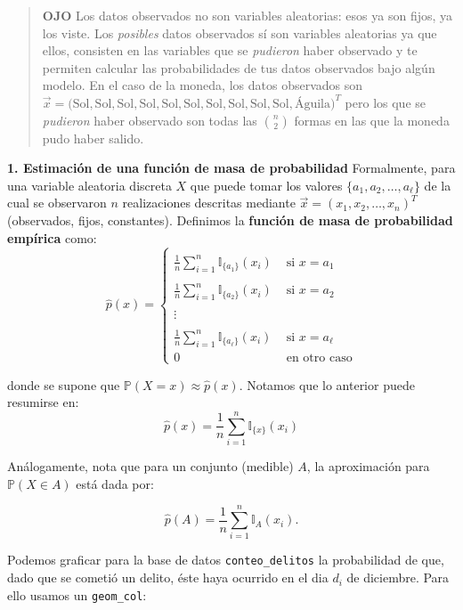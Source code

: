 \documentclass[
]{book}
\begin{document}
\begin{quote}
\textbf{OJO} Los datos observados no son variables aleatorias: esos ya son fijos, ya los viste. Los \emph{posibles} datos observados sí son variables aleatorias ya que ellos, consisten en las variables que se \emph{pudieron} haber observado y te permiten calcular las probabilidades de tus datos observados bajo algún modelo. En el caso de la moneda, los datos observados son \(\vec{x} = \big( \text{Sol}, \text{Sol},\text{Sol},\text{Sol},\text{Sol},\text{Sol},\text{Sol},\text{Sol},\text{Sol},\text{Sol},\text{Águila}\big)^T\) pero los que se \emph{pudieron} haber observado son todas las \(\binom{n}{2}\) formas en las que la moneda pudo haber salido.
\end{quote}

\textbf{1. Estimación de una función de masa de probabilidad}
Formalmente, para una variable aleatoria discreta \(X\) que puede tomar los valores \(\{ a_1, a_2, \dots, a_{\ell} \}\) de la cual se observaron \(n\) realizaciones descritas mediante \(\vec{x} = (x_1, x_2, \dots, x_n)^T\) (observados, fijos, constantes). Definimos la \textbf{función de masa de probabilidad empírica} como:
\[
\hat{p}(x) = \begin{cases}
\\
\frac{1}{n} \sum_{i=1}^{n} \mathbb{I}_{\{a_1\}}(x_i) & \text{ si } x = a_1 \\ \\
\frac{1}{n} \sum_{i=1}^{n} \mathbb{I}_{\{a_2\}}(x_i) & \text{ si } x = a_2 \\ \\
\vdots \\ \\
\frac{1}{n} \sum_{i=1}^{n} \mathbb{I}_{\{a_{\ell}\}}(x_i) & \text{ si } x = a_{\ell} \\
0 & \text{ en otro caso}
\end{cases}
\]

donde se supone que \(\mathbb{P}(X = x) \approx \hat{p}(x)\). Notamos que lo anterior puede resumirse en:
\[
\hat{p}(x) = \frac{1}{n} \sum_{i=1}^{n} \mathbb{I}_{\{ x\}}(x_i)
\]

Análogamente, nota que para un conjunto (medible) \(A\), la aproximación para \(\mathbb{P}(X \in A)\) está dada por:

\[
\hat{p}(A) = \dfrac{1}{n}\sum\limits_{i=1}^{n} \mathbb{I}_A (x_i).
\]

Podemos graficar para la base de datos \texttt{conteo\_delitos} la probabilidad de que, dado que se cometió un delito, éste haya ocurrido en el dia \(d_i\) de diciembre. Para ello usamos un \texttt{geom\_col}:
\end{document}
